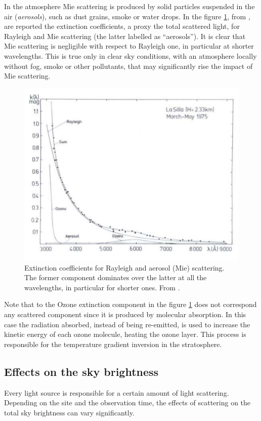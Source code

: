 In the atmosphere Mie scattering is produced by solid particles suspended in the air (\emph{aerosols}), such as dust grains, smoke or water drops. In the figure \ref{fig:scattering_sources}, from \cite{tug1977vertical}, are reported the extinction coefficients, a proxy the total scattered light, for Rayleigh and Mie scattering (the latter labelled as ``aerosols''). It is clear that Mie scattering is negligible with respect to Rayleigh one, in particular at shorter wavelengths. This is true only in clear sky conditions, with an atmosphere locally without fog, smoke or other pollutants, that may significantly rise the impact of Mie scattering.
\begin{figure}
	\centering
	\includegraphics[width=.65\textwidth]{./2_natural_sky/scattering_sources}
	\caption{Extinction coefficients for Rayleigh and aerosol (Mie) scattering. The former component dominates over the latter at all the wavelengths, in particular for shorter ones. From \cite{tug1977vertical}.\label{fig:scattering_sources}}
\end{figure}

Note that to the Ozone extinction component in the figure \ref{fig:scattering_sources} does not correspond any scattered component since it is produced by molecular absorption. In this case the radiation absorbed, instead of being re-emitted, is used to increase the kinetic energy of each ozone molecule, heating the ozone layer. This process is responsible for the temperature gradient inversion in the stratosphere.

\subsection{Effects on the sky brightness}
Every light source is responsible for a certain amount of light scattering. Depending on the site and the observation time, the effects of scattering on the total sky brightness can vary significantly.

